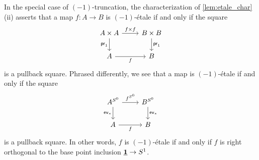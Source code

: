 \documentclass[9pt,twosided]{amsart}
\begin{document}
\begin{eg}\label{rmk:-1etale}
In the special case of $(-1)$-truncation, the characterization of \cref{lem:etale_char} (ii) asserts that a map $f:A\to B$ is $(-1)$-\'etale if and only if the square
\begin{equation*}
\begin{tikzcd}
A\times A \arrow[d,swap,"\proj 1"] \arrow[r,"{f\times f}"] & B\times B \arrow[d,"\proj 1"] \\
A \arrow[r,swap,"f"] & B
\end{tikzcd}
\end{equation*}
is a pullback square. Phrased differently, we see that a map is $(-1)$-\'etale if and only if the square
\begin{equation*}
\begin{tikzcd}
A^{\sphere{0}} \arrow[d,swap,"\mathsf{ev}_\ast"] \arrow[r,"f^{\sphere{0}}"] & B^{\sphere{0}} \arrow[d,"\mathsf{ev}_\ast"] \\
A \arrow[r,swap,"f"] & B
\end{tikzcd}
\end{equation*}
is a pullback square. In other words, $f$ is $(-1)$-\'etale if and only if $f$ is right orthogonal to the base point inclusion $\underline{\mathbf{1}}\to S^{1}$. 
\end{eg}
\end{document}
